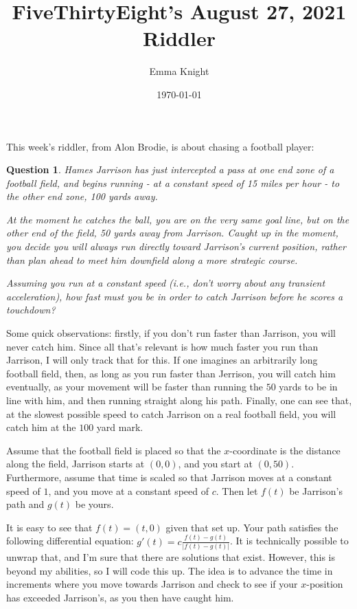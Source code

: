 \documentclass[11pt]{article}
\title{FiveThirtyEight's August 27, 2021 Riddler}
\author{Emma Knight}
\date{\today}
\newtheorem{question}[theorem]{Question}
\theoremstyle{definition}
\begin{document}
\maketitle

This week's riddler, from Alon Brodie, is about chasing a football player:
\begin{question}
Hames Jarrison has just intercepted a pass at one end zone of a football field, and begins running - at a constant speed of 15 miles per hour - to the other end zone, 100 yards away.

At the moment he catches the ball, you are on the very same goal line, but on the other end of the field, 50 yards away from Jarrison. Caught up in the moment, you decide you will always run directly toward Jarrison’s current position, rather than plan ahead to meet him downfield along a more strategic course.

Assuming you run at a constant speed (i.e., don’t worry about any transient acceleration), how fast must you be in order to catch Jarrison before he scores a touchdown?
\end{question}
Some quick observations: firstly, if you don't run faster than Jarrison, you will never catch him.  Since all that's relevant is how much faster you run than Jarrison, I will only track that for this.  If one imagines an arbitrarily long football field, then, as long as you run faster than Jerrison, you will catch him eventually, as your movement will be faster than running the $50$ yards to be in line with him, and then running straight along his path.  Finally, one can see that, at the slowest possible speed to catch Jarrison on a real football field, you will catch him at the $100$ yard mark.

Assume that the football field is placed so that the $x$-coordinate is the distance along the field, Jarrison starts at $(0, 0)$, and you start at $(0, 50)$.  Furthermore, assume that time is scaled so that Jarrison moves at a constant speed of $1$, and you move at a constant speed of $c$.  Then let $f(t)$ be Jarrison's path and $g(t)$ be yours.

It is easy to see that $f(t) = (t, 0)$ given that set up.  Your path satisfies the following differential equation: $g'(t) = c\frac{f(t)-g(t)}{|f(t)-g(t)|}$.  It is technically possible to unwrap that, and I'm sure that there are solutions that exist.  However, this is beyond my abilities, so I will code this up.  The idea is to advance the time in increments where you move towards Jarrison and check to see if your $x$-position has exceeded Jarrison's, as you then have caught him.
\end{document}
